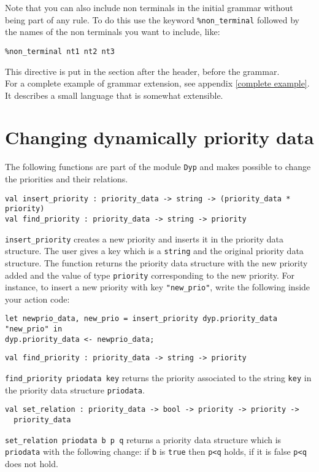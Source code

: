 \documentclass[12pt]{article}
\begin{document}
{Note that you can also include non terminals in the initial grammar without being part of any rule. To do this use the keyword \verb|%non_terminal| followed by the names of the non terminals you want to include, like:
\begin{verbatim}
%non_terminal nt1 nt2 nt3
\end{verbatim}
This directive is put in the section after the header, before the grammar.\\

For a complete example of grammar extension, see appendix \ref{complete example}. It describes a small language that is somewhat extensible.

\section{Changing dynamically priority data}\label{dynamic priority}

The following functions are part of the module \verb|Dyp| and makes possible to change the priorities and their relations.

\begin{verbatim}
val insert_priority : priority_data -> string -> (priority_data * priority)
val find_priority : priority_data -> string -> priority
\end{verbatim}
\verb|insert_priority| creates a new priority and inserts it in the priority data structure. The user gives a key which is a \texttt{string} and the original priority data structure. The function returns the priority data structure with the new priority added and the value of type \texttt{priority} corresponding to the new priority. For instance, to insert a new priority with key \texttt{"new\_prio"}, write the following inside your action code:
\begin{verbatim}
let newprio_data, new_prio = insert_priority dyp.priority_data "new_prio" in
dyp.priority_data <- newprio_data;
\end{verbatim}

\begin{verbatim}
val find_priority : priority_data -> string -> priority
\end{verbatim}
\texttt{find\_priority priodata key} returns the priority associated to the string \texttt{key} in the priority data structure \texttt{priodata}.

\begin{verbatim}
val set_relation : priority_data -> bool -> priority -> priority ->
  priority_data
\end{verbatim}
\texttt{set\_relation priodata b p q} returns a priority data structure which is \texttt{priodata} with the following change: if \texttt{b} is \texttt{true} then \texttt{p<q} holds, if it is false \texttt{p<q} does not hold.

}
\end{document}
